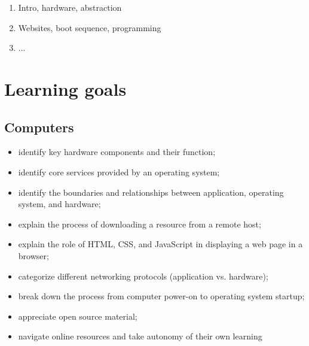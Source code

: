 \documentclass[11pt]{article}
\begin{document}
\begin{enumerate}
    \setcounter{enumi}{0}
  \item Intro, hardware, abstraction
  \item Websites, boot sequence, programming
  \item ...
\end{enumerate}

\section*{Learning goals}

\subsection*{Computers}

\begin{itemize}
  \item identify key hardware components and their function;
  \item identify core services provided by an operating system;
  \item identify the boundaries and relationships between application,
    operating system, and hardware;
  \item explain the process of downloading a resource from a remote host;
  \item explain the role of HTML, CSS, and JavaScript in displaying a web page
    in a browser;
  \item categorize different networking protocols (application vs. hardware);
  \item break down the process from computer power-on to operating system
    startup;
  \item appreciate open source material;
  \item navigate online resources and take autonomy of their own learning
\end{itemize}
\end{document}

